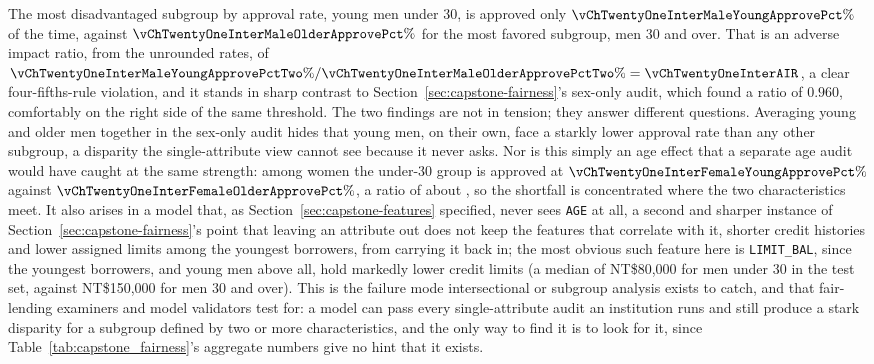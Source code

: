 \documentclass[../ai_in_finance]{subfiles}
\begin{document}
The most disadvantaged subgroup by approval rate, young men under 30, is approved only $\vChTwentyOneInterMaleYoungApprovePct\%$ of the time, against $\vChTwentyOneInterMaleOlderApprovePct\%$ for the most favored subgroup, men 30 and over. That is an adverse impact ratio, from the unrounded rates, of $\vChTwentyOneInterMaleYoungApprovePctTwo\%/\vChTwentyOneInterMaleOlderApprovePctTwo\% = \vChTwentyOneInterAIR$, a clear four-fifths-rule violation, and it stands in sharp contrast to Section~\ref{sec:capstone-fairness}'s sex-only audit, which found a ratio of $0.960$, comfortably on the right side of the same threshold. The two findings are not in tension; they answer different questions. Averaging young and older men together in the sex-only audit hides that young men, on their own, face a starkly lower approval rate than any other subgroup, a disparity the single-attribute view cannot see because it never asks. Nor is this simply an age effect that a separate age audit would have caught at the same strength: among women the under-30 group is approved at $\vChTwentyOneInterFemaleYoungApprovePct\%$ against $\vChTwentyOneInterFemaleOlderApprovePct\%$, a ratio of about \vChTwentyOneInterFemaleRatio, so the shortfall is concentrated where the two characteristics meet. It also arises in a model that, as Section~\ref{sec:capstone-features} specified, never sees \texttt{AGE} at all, a second and sharper instance of Section~\ref{sec:capstone-fairness}'s point that leaving an attribute out does not keep the features that correlate with it, shorter credit histories and lower assigned limits among the youngest borrowers, from carrying it back in; the most obvious such feature here is \texttt{LIMIT\_BAL}, since the youngest borrowers, and young men above all, hold markedly lower credit limits (a median of NT\$80{,}000 for men under 30 in the test set, against NT\$150{,}000 for men 30 and over). This is the failure mode intersectional or subgroup analysis exists to catch, and that fair-lending examiners and model validators test for: a model can pass every single-attribute audit an institution runs and still produce a stark disparity for a subgroup defined by two or more characteristics, and the only way to find it is to look for it, since Table~\ref{tab:capstone_fairness}'s aggregate numbers give no hint that it exists.
\end{document}
